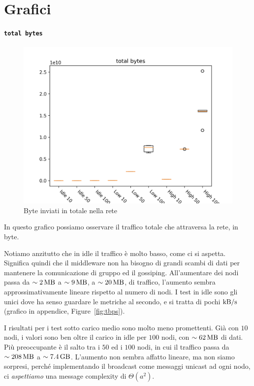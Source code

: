 \documentclass[target=bach]{thud}
\begin{document}
\section{Grafici}

\paragraph{\lstinline{total bytes}}

\begin{figure}[H]
    \centering
    \includegraphics[width=0.7\linewidth, keepaspectratio]{graphs/total bytes.png}
    \caption{Byte inviati in totale nella rete}
    \label{fig:tb}
\end{figure}

In questo grafico possiamo osservare il traffico totale che attraversa la rete, in byte.

Notiamo anzitutto che in idle il traffico è molto basso, come ci si aspetta. Significa quindi che il middleware non ha bisogno di grandi scambi di dati per mantenere la comunicazione di gruppo ed il gossiping.
All'aumentare dei nodi passa da $\sim\qty{2}{\mega\byte}$ a $\sim\qty{9}{\mega\byte}$, a $\sim\qty{20}{\mega\byte}$, di traffico, l'aumento sembra approssimativamente lineare rispetto al numero di nodi.
I test in idle sono gli unici dove ha senso guardare le metriche al secondo, e si tratta di pochi $\unit{\kilo\byte/\second}$ (grafico in appendice, Figure~\ref{fig:tbps}).

I risultati per i test sotto carico medio sono molto meno promettenti. Già con $10$ nodi, i valori sono ben oltre il carico in idle per $100$ nodi, con $\sim\qty{62}{\mega\byte}$ di dati.\\
Più preoccupante è il salto tra i $50$ ed i $100$ nodi, in cui il traffico passa da $\sim\qty{208}{\mega\byte}$ a $\sim\qty{7.4}{\giga\byte}$. L'aumento non sembra affatto lineare, ma non siamo sorpresi, perché implementando il broadcast come messaggi unicast ad ogni nodo, ci \emph{aspettiamo} una message complexity di $\Theta(a^2)$.
\end{document}
